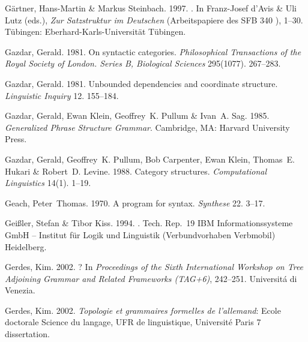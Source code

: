 \begin{thebibliography}{1420}
G{\"a}rtner, Hans-Martin \& Markus Steinbach. 1997.
.
\newblock In Franz-Josef d'Avis \& Uli Lutz (eds.), \emph{{Zur Satzstruktur im
  Deutschen}} (Arbeitspapiere des SFB 340 ), 1--30. T{\"u}bingen:
  Eberhard-Karls-Uni\-ver\-si\-t{\"a}t T{\"u}bingen.

Gazdar, Gerald. 1981{}.
\newblock On syntactic categories.
\newblock \emph{Philosophical Transactions of the Royal Society of London.
  Series B, Biological Sciences} 295(1077). 267--283.

Gazdar, Gerald. 1981{}.
\newblock Unbounded dependencies and coordinate structure.
\newblock \emph{Linguistic Inquiry} 12. 155--184.

Gazdar, Gerald, Ewan Klein, Geoffrey~K. Pullum \& Ivan~A. Sag. 1985.
\newblock \emph{{Generalized Phrase Structure Grammar}}.
\newblock Cambridge, MA: Harvard University Press.

Gazdar, Gerald, Geoffrey~K. Pullum, Bob Carpenter, Ewan Klein, Thomas~E. Hukari
  \& Robert~D. Levine. 1988.
\newblock Category structures.
\newblock \emph{Computational Linguistics} 14(1). 1--19.

Geach, Peter~Thomas. 1970.
\newblock A program for syntax.
\newblock \emph{Synthese} 22. 3--17.

Gei{\ss}ler, Stefan \& Tibor Kiss. 1994.
.
\newblock Tech. Rep.~19 IBM Informationssysteme GmbH -- Institut f{\"u}r Logik
  und Linguistik (Verbundvorhaben Verbmobil) Heidelberg.

Gerdes, Kim. 2002{}.
?
\newblock In \emph{Proceedings of the {Sixth International Workshop on Tree
  Adjoining Grammar and Related Frameworks (TAG+6)}}, 242--251. Universit{\'a}
  di Venezia.

Gerdes, Kim. 2002{}.
\newblock \emph{Topologie et grammaires formelles de l'allemand}: Ecole
  doctorale Science du langage, UFR de linguistique, Universit{\'e} Paris 7
  dissertation.


\end{thebibliography}
